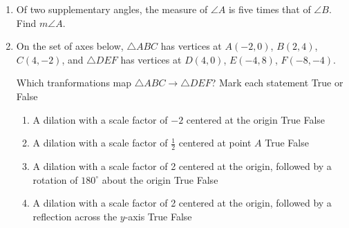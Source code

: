 \documentclass[12pt, twoside]{article}
\begin{document}
\begin{enumerate}
\newpage

  \item Of two supplementary angles, the measure of $\angle A$ is five times that of $\angle B$. Find $m\angle A$. \vspace{5cm} 


  \item On the set of axes below, $\triangle ABC$ has vertices at $A(-2,0)$, $B(2,4)$, $C(4,-2)$, and $\triangle DEF$ has vertices at $D(4,0)$, $E(-4,8)$, $F(-8,-4)$.
  \begin{center}
  \end{center}
  Which tranformations map $\triangle ABC \rightarrow \triangle DEF$? Mark each statement True or False
    \begin{enumerate}
      \item A dilation with a scale factor of $-2$ centered at the origin \hfill True \quad False
      \item A dilation with a scale factor of $\frac{1}{2}$ centered at point $A$ \hfill True \quad False
      \item A dilation with a scale factor of 2 centered at the origin, followed by a rotation of $180^\circ$ about the origin \hfill True \quad False
      \item A dilation with a scale factor of 2 centered at the origin, followed by a reflection across the $y$-axis \hfill True \quad False
    \end{enumerate}


\end{enumerate}
\end{document}
